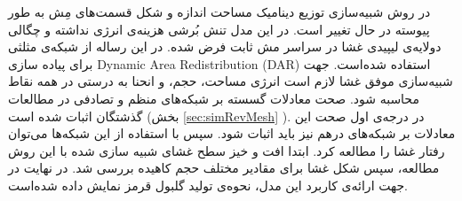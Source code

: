 در روش شبیه‌سازی توزیع دینامیک مساحت
اندازه و شکل قسمت‌های مِش به طور پیوسته در حال تغییر است. در این مدل تنش بُرشی هزینه‌ی انرژی نداشته و چگالی دولایه‌ی لیپیدی غشا در سراسر مش ثابت فرض شده. در این رساله از شبکه‌ی مثلثی برای پیاده سازی 
Dynamic Area Redistribution (DAR)
استفاده شده‌است. جهت شبیه‌سازی موفق غشا لازم است انرژی مساحت، حجم، و انحنا به درستی در همه نقاط محاسبه شود. صحت معادلات گسسته بر شبکه‌های منظم و تصادفی در مطالعات گذشتگان اثبات شده است (بخش 
\ref{sec:simRevMesh}
). در درجه‌ی اول صحت این معادلات بر شبکه‌های درهم نیز باید اثبات شود. سپس با استفاده از این شبکه‌ها می‌توان رفتار غشا را مطالعه کرد. ابتدا افت و خیز سطح غشای شبیه‌ سازی شده با این روش مطالعه، سپس شکل غشا برای مقادیر مختلف حجم کاهیده بررسی شد. در نهایت در جهت ارائه‌ی کاربرد این مدل، نحوه‌ی تولید گلبول قرمز نمایش داده شده‌است.